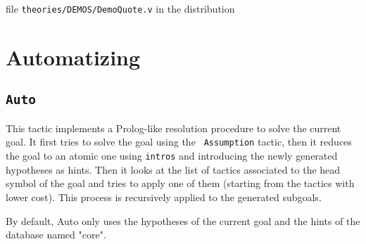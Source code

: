 \SeeAlso file \texttt{theories/DEMOS/DemoQuote.v} in the distribution

\section{Automatizing}
\label{Automatizing}

\subsection{\tt Auto}
This tactic implements a Prolog-like resolution procedure to solve the
current goal. It first tries to solve the goal using the {\tt
  Assumption} tactic, then it reduces the goal to an atomic one using
{\tt intros} and introducing the newly generated hypotheses as hints.
Then it looks at the list of tactics associated to the head symbol of
the goal and tries to apply one of them (starting from the tactics
with lower cost). This process is recursively applied to the generated
subgoals. 

By default, Auto only uses the hypotheses of the current goal and the
hints of the database named "core". 


